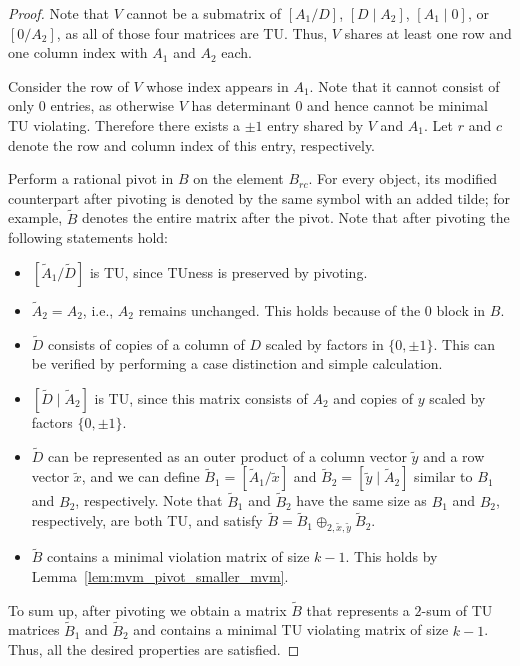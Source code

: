 \documentclass{article}
\theoremstyle{definition}
\begin{document}
\begin{proof}
    Note that $V$ cannot be a submatrix of $\left[A_{1} / D\right]$, $\left[D \mid A_{2}\right]$, $\left[A_{1} \mid 0\right]$, or $\left[0 / A_{2}\right]$, as all of those four matrices are TU. Thus, $V$ shares at least one row and one column index with $A_{1}$ and $A_{2}$ each.

    Consider the row of $V$ whose index appears in $A_{1}$. Note that it cannot consist of only $0$ entries, as otherwise $V$ has determinant $0$ and hence cannot be minimal TU violating. Therefore there exists a $\pm 1$ entry shared by $V$ and $A_{1}$. Let $r$ and $c$ denote the row and column index of this entry, respectively.

    Perform a rational pivot in $B$ on the element $B_{rc}$. For every object, its modified counterpart after pivoting is denoted by the same symbol with an added tilde; for example, $\tilde{B}$ denotes the entire matrix after the pivot. Note that after pivoting the following statements hold:
    \begin{itemize}
        \item $\left[\tilde{A}_{1} / \tilde{D}\right]$ is TU, since TUness is preserved by pivoting.
        \item $\tilde{A}_{2} = A_{2}$, i.e., $A_{2}$ remains unchanged. This holds because of the $0$ block in $B$.
        \item $\tilde{D}$ consists of copies of a column of $D$ scaled by factors in $\{0, \pm 1\}$. This can be verified by performing a case distinction and simple calculation.
        \item $\left[\tilde{D} \mid \tilde{A}_{2}\right]$ is TU, since this matrix consists of $A_{2}$ and copies of $y$ scaled by factors $\{0, \pm 1\}$.
        \item $\tilde{D}$ can be represented as an outer product of a column vector $\tilde{y}$ and a row vector $\tilde{x}$, and we can define $\tilde{B}_{1} = \left[\tilde{A}_{1} / \tilde{x}\right]$ and $\tilde{B}_{2} = \left[\tilde{y} \mid \tilde{A}_{2}\right]$ similar to $B_{1}$ and $B_{2}$, respectively. Note that $\tilde{B}_{1}$ and $\tilde{B}_{2}$ have the same size as $B_{1}$ and $B_{2}$, respectively, are both TU, and satisfy $\tilde{B} = \tilde{B}_{1} \oplus_{2, \tilde{x}, \tilde{y}} \tilde{B}_{2}$.
        \item $\tilde{B}$ contains a minimal violation matrix of size $k - 1$. This holds by Lemma~\ref{lem:mvm_pivot_smaller_mvm}.
    \end{itemize}
    To sum up, after pivoting we obtain a matrix $\tilde{B}$ that represents a $2$-sum of TU matrices $\tilde{B}_{1}$ and $\tilde{B}_{2}$ and contains a minimal TU violating matrix of size $k - 1$. Thus, all the desired properties are satisfied.
\end{proof}
\end{document}
